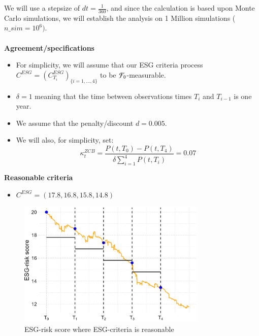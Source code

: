 We will use a stepsize of $dt = \frac{1}{360}$, and since the calculation is based upon Monte Carlo simulations, we will establish the analysis on 1 Million simulations ($n\_sim = 10^{6})$. 
\\~\\ 
\textbf{Agreement/specifications}
\begin{itemize}
    \item For simplicity, we will assume that our ESG criteria process $C^{ESG} = (C^{ESG}_{T_{i}})_{
    \{i=1, \dots, 4\}}$ to be $\mathcal{F}_{0}$-measurable. 
    \item $\delta = 1$ meaning that the time between observations times $T_{i}$ and $T_{i-1}$ is one year. 
    \item We assume that the penalty/discount $d = 0.005$.
    \item We will also, for simplicity, set: 
    \[
    \kappa_{t}^{ZCB} = \frac{P(t,T_{0})-P(t,T_{4})}{\delta \sum_{i=1}^{4}P(t,T_{i})} = 0.07
    \]
\end{itemize}
\newpage 

\textbf{Reasonable criteria}
\begin{itemize}
    \item $C^{ESG} = (17.8, 16.8, 15.8, 14.8)$
\end{itemize}

\begin{figure}[htp]
    \centering
    \includegraphics[width= 9cm]{figures/ESG/ESG_plt_criteria1.png}
    \caption{ESG-risk score where ESG-criteria is reasonable}
    \label{fig: ESG_risk_criteria1}
\end{figure}

